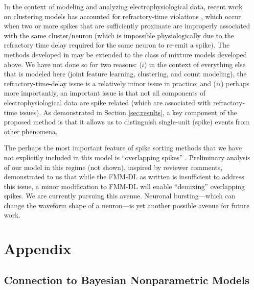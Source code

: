 \documentclass[journal]{IEEEtran}
\begin{document}
In the context of modeling and analyzing electrophysiological data, recent work on clustering models has accounted for refractory-time
violations \cite{Wood2009,Calabrese2010,Bo2011}, which occur when two or more spikes that
are sufficiently proximate are improperly associated with the same
cluster/neuron (which is impossible physiologically due to the refractory time delay
required for the same neuron to re-emit a spike). The methods developed in \cite{Wood2009,Bo2011} may be extended to the class of mixture models developed above. We have not done so for two reasons: ($i$) in the context of everything else that is modeled here (joint feature learning, clustering, and count modeling), the refractory-time-delay issue is a relatively minor issue in practice; and ($ii$) perhaps more importantly, an important issue is that not all components of electrophysiological data are spike related (which are associated with refractory-time issues). As demonstrated in Section \ref{sec:results}, a key component of the proposed method is that it allows us to distinguish single-unit (spike) events from other phenomena.


The perhaps the most important feature of spike sorting methods that we have not explicitly included in this model is ``overlapping spikes'' \cite{Bar-Gad2001, Zhang2004, Wang2006, Vargas-Irwin2007, Herbst2008a, Adamos2010, Franke2010b}. Preliminary analysis of our model in this regime (not shown), inspired by reviewer comments, demonstrated to us that while the FMM-DL as written is insufficient to address this issue, a minor modification to FMM-DL will enable ``demixing'' overlapping spikes.  We are currently pursuing this avenue.  Neuronal bursting---which can change the waveform shape of a neuron---is yet another possible avenue for future work.  


\section*{Appendix} \label{sec:appendix}

\setcounter{subsection}{0}
\subsection{Connection to Bayesian Nonparametric Models} %
\label{sub:connection_to_previous_bayesian_non_parametrics}

\end{document}
